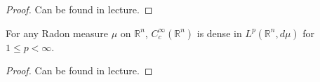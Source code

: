 \ifdetailed 
\begin{proof}
    Can be found in lecture.
\end{proof}
\fi 
\begin{corollary}
    For any Radon measure \(\mu\) on \(\mathbb{R}^n\), \(C^{\infty}_{c}(\mathbb{R}^n)\) is dense in \(L^p(\mathbb{R}^n, d\mu)\) for \(1\leq p <\infty\).
\end{corollary}
\ifdetailed 
\begin{proof}
    Can be found in lecture.
\end{proof}
\fi 